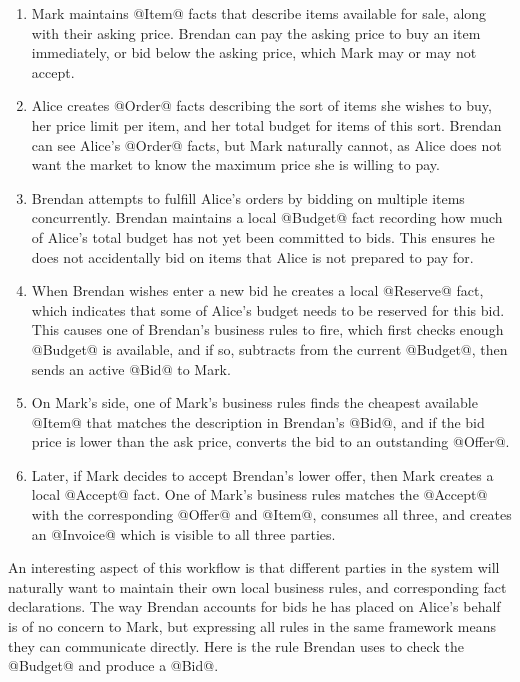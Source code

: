 \begin{enumerate}
\item Mark maintains @Item@ facts that describe items available for sale, along with their asking price. Brendan can pay the asking price to buy an item immediately, or bid below the asking price, which Mark may or may not accept.

\item Alice creates @Order@ facts describing the sort of items she wishes to buy, her price limit per item, and her total budget for items of this sort. Brendan can see Alice's @Order@ facts, but Mark naturally cannot, as Alice does not want the market to know the maximum price she is willing to pay.

\item Brendan attempts to fulfill Alice's orders by bidding on multiple items concurrently. Brendan maintains a local @Budget@ fact recording how much of Alice's total budget has not yet been committed to bids. This ensures he does not accidentally bid on items that Alice is not prepared to pay for.

\item When Brendan wishes enter a new bid he creates a local @Reserve@ fact, which indicates that some of Alice's budget needs to be reserved for this bid. This causes one of Brendan's business rules to fire, which first checks enough @Budget@ is available, and if so, subtracts from the current @Budget@, then sends an active @Bid@ to Mark.

\item On Mark's side, one of Mark's business rules finds the cheapest available @Item@ that matches the description in Brendan's @Bid@, and if the bid price is lower than the ask price, converts the bid to an outstanding @Offer@.

\item Later, if Mark decides to accept Brendan's lower offer, then Mark creates a local @Accept@ fact. One of Mark's business rules matches the @Accept@ with the corresponding @Offer@ and @Item@, consumes all three, and creates an @Invoice@ which is visible to all three parties.
\end{enumerate}

An interesting aspect of this workflow is that different parties in the system will naturally want to maintain their own local business rules, and corresponding fact declarations. The way Brendan accounts for bids he has placed on Alice's behalf is of no concern to Mark, but expressing all rules in the same framework means they can communicate directly. Here is the rule Brendan uses to check the @Budget@ and produce a @Bid@.

